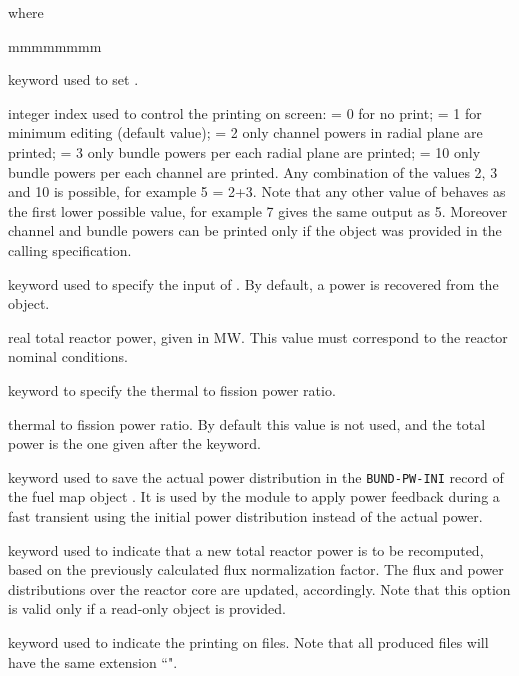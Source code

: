 \noindent where
\begin{ListeDeDescription}{mmmmmmmm}

\item[\moc{EDIT}] keyword used to set .

\item[\dusa{iprint}] integer index used to control the printing on screen:
 = 0 for no print; = 1 for minimum editing (default value); = 2 only channel powers in radial
plane are printed; = 3 only bundle powers per each radial plane are printed; = 10 only bundle powers per each channel are printed. Any combination of the values 2, 3 and 10 is possible, for example 5 = 2+3. Note that any other value of  behaves as the first lower possible value, for example 7 gives the same output as 5. Moreover channel and bundle powers can be printed only if the  object was provided in the calling specification.

\item[\moc{PTOT}] keyword used to specify the input of . By default, a power is recovered from the  object.

\item[\dusa{power}] real total reactor power, given in MW. This value
must correspond to the reactor nominal conditions.

\item[\moc{FSTH}] keyword to specify the thermal to fission power ratio.

\item[\dusa{fsth}] thermal to fission power ratio. By default this value is not used, and the total
power is the one given after the  keyword.

\item[\moc{INIT}] keyword used to save the actual power distribution in the {\tt BUND-PW-INI}
record of the fuel map object . It is used by the  module to apply power
feedback during a fast transient using the initial power distribution instead of the actual power.

\item[\moc{P-NEW}] keyword used to indicate that a new total reactor power
is to be recomputed, based on the previously calculated flux normalization factor.
The flux and power distributions over the reactor core are updated, accordingly.
Note that this option is valid only if a read-only  object is provided.

\item[\moc{PRINT}] keyword used to indicate the printing on files. Note
that all produced files will have the same extension ``".


\end{ListeDeDescription}
